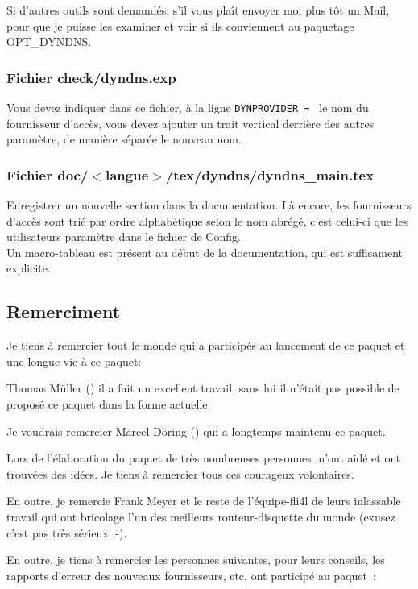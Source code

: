 Si d'autres outils sont demandés, s'il vous plaît envoyer moi plus tôt un Mail,
pour que je puisse les examiner et voir si ils conviennent au paquetage OPT\_DYNDNS.

\subsubsection{Fichier check/dyndns.exp}

Vous devez indiquer dans ce fichier, à la ligne \texttt{DYNPROVIDER = } le nom du
fournisseur d'accès, vous devez ajouter un trait vertical derrière des autres
paramètre, de manière séparée le nouveau nom.

\subsubsection{Fichier doc/$<$langue$>$/tex/dyndns/dyndns\_main.tex}

Enregistrer un nouvelle section dans la documentation. Là encore, les
fournisseurs d'accès sont trié par ordre alphabétique selon le nom abrégé,
c'est celui-ci que les utilisateurs paramètre dans le fichier de Config. \\
Un macro-tableau est présent au début de la documentation, qui est
suffisament explicite.

\subsection{Remerciment}

Je tiens à remercier tout le monde qui a participés au lancement de ce
paquet et une longue vie à ce paquet:

Thomas Müller () il a fait un excellent travail,
sans lui il n'était pas possible de proposé ce paquet dans la forme actuelle.

Je voudrais remercier Marcel Döring () qui a longtemps
maintenu ce paquet.

Lors de l'élaboration du paquet de très nombreuses personnes m'ont aidé et
ont trouvées des idées. Je tiens à remercier tous ces courageux volontaires.

En outre, je remercie Frank Meyer et le reste de l'équipe-fli4l de leurs
inlassable travail qui ont bricolage l'un des meilleurs routeur-disquette
du monde (exusez c'est pas très sérieux ;-).

En outre, je tiens à remercier les personnes suivantes, pour leurs conseils,
les rapports d'erreur des nouveaux fournisseurs, etc, ont participé au paquet~:


